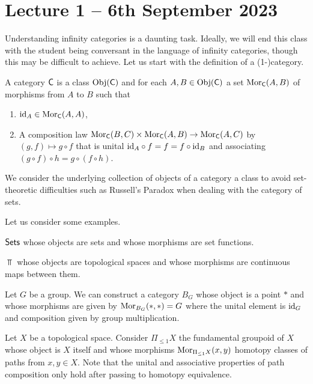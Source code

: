 \section{Lecture 1 -- 6th September 2023}
Understanding infinity categories is a daunting task. Ideally, we will end this class with the student being conversant in the language of infinity categories, though this may be difficult to achieve. Let us start with the definition of a (1-)category. 
\begin{definition}[Category]
    A category $\mathsf{C}$ is a class $\mathrm{Obj}(\mathsf{C})$ and for each $A,B\in\mathrm{Obj}(\mathsf{C})$ a set $\mathrm{Mor}_{\mathsf{C}}(A,B)$ of morphisms from $A$ to $B$ such that
    \begin{enumerate}[label=(\alph*)]
        \item $\mathrm{id}_{A}\in\mathrm{Mor}_{\mathsf{C}}(A,A)$,
        \item A composition law $\mathrm{Mor}_{\mathsf{C}}(B,C)\times\mathrm{Mor}_{\mathsf{C}}(A,B)\to\mathrm{Mor}_{\mathsf{C}}(A,C)$ by $(g,f)\mapsto g\circ f$ that is unital $\mathrm{id}_{A}\circ f=f=f\circ\mathrm{id}_{B}$ and associating $(g\circ f)\circ h=g\circ(f\circ h)$. 
    \end{enumerate}
\end{definition}
\begin{remark}
  We consider the underlying collection of objects of a category a class to avoid set-theoretic difficulties such as Russell's Paradox when dealing with the category of sets. 
\end{remark}
Let us consider some examples. 
\begin{example}
  $\mathsf{Sets}$ whose objects are sets and whose morphisms are set functions. 
\end{example}
\begin{example}
  $\Top$ whose objects are topological spaces and whose morphisms are continuous maps between them. 
\end{example}
\begin{example}\label{ex:representable spaces}
Let $G$ be a group. We can construct a category $B_{G}$ whose object is a point $*$ and whose morphisms are given by $\mathrm{Mor}_{B_{G}}(*,*)=G$ where the unital element is $\mathrm{id}_{G}$ and composition given by group multiplication.
\end{example}
\begin{example}\label{ex: fundamental groupoid}
Let $X$ be a topological space. Consider $\Pi_{\leq1}X$ the fundamental groupoid of $X$ whose object is $X$ itself and whose morphisms $\mathrm{Mor}_{\Pi_{\leq1}X}(x,y)$ homotopy classes of paths from $x,y\in X$. Note that the unital and associative properties of path composition only hold after passing to homotopy equivalence. 
\end{example}
